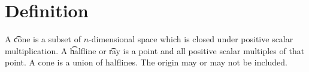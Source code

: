 

\section*{Definition}

A \t{cone} is a subset of $n$-dimensional space which is closed under positive scalar multiplication.
A \t{halfline} or \t{ray} is a point and all positive scalar multiples of that point.
A cone is a union of halflines.
The origin may or may not be included.

\blankpage